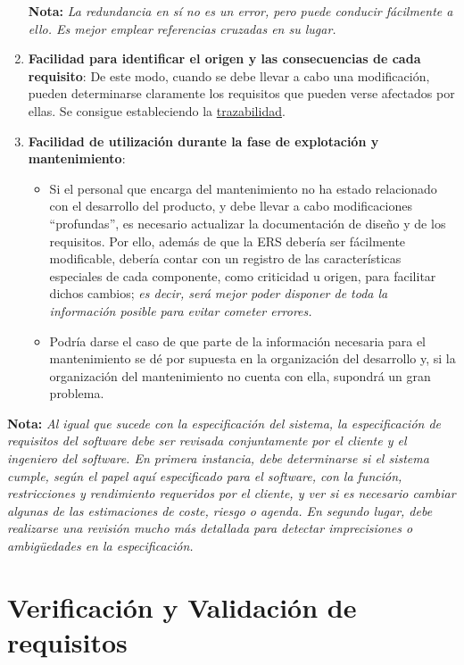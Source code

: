 \begin{enumerate}
    \textbf{Nota:} \textit{La redundancia en sí no es un error, pero puede conducir fácilmente a ello. Es mejor emplear referencias cruzadas en su lugar.}
    \item \textbf{Facilidad para identificar el origen y las consecuencias de cada requisito}: De este modo, cuando se debe llevar a cabo una modificación, pueden determinarse claramente los requisitos que pueden verse afectados por ellas. Se consigue estableciendo la \uline{trazabilidad}.
    \item \textbf{Facilidad de utilización durante la fase de explotación y mantenimiento}:
        \begin{itemize}
            \item Si el personal que encarga del mantenimiento no ha estado relacionado con el desarrollo del producto, y debe llevar a cabo modificaciones ``profundas'', es necesario actualizar la documentación de diseño y de los requisitos. Por ello, además de que la ERS debería ser fácilmente modificable, debería contar con un registro de las características especiales de cada componente, como criticidad u origen, para facilitar dichos cambios; \textit{es decir, será mejor poder disponer de toda la información posible para evitar cometer errores.}
            \item Podría darse el caso de que parte de la información necesaria para el mantenimiento se dé por supuesta en la organización del desarrollo y, si la organización del mantenimiento no cuenta con ella, supondrá un gran problema.
        \end{itemize}
\end{enumerate}

\textbf{Nota:} \textit{Al igual que sucede con la especificación del sistema, la especificación de requisitos del software debe ser revisada conjuntamente por el cliente y el ingeniero del software. En primera instancia, debe determinarse si el sistema cumple, según el papel aquí especificado para el software, con la función, restricciones y rendimiento requeridos por el cliente, y ver si es necesario cambiar algunas de las estimaciones de coste, riesgo o agenda. En segundo lugar, debe realizarse una revisión mucho más detallada para detectar imprecisiones o ambigüedades en la especificación.}


\section{Verificación y Validación de requisitos}

